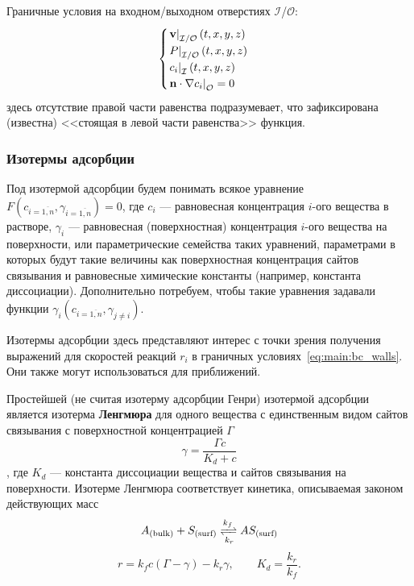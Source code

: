 \documentclass[oneside,final,12pt]{extreport}
\begin{document}
Граничные условия на входном/выходном отверстиях $\mathcal{I}$/$\mathcal{O}$:
\begin{equation}
\begin{cases}
  \left. \vb v \right|_{\mathcal{I}/\mathcal{O}}\left(t, x, y, z\right) \\
  \left. P \right|_{\mathcal{I}/\mathcal{O}}\left(t, x, y, z\right) \\
  \left. c_i \right|_{\mathcal{I}}\left(t, x, y, z\right) \\
  \left. \vb n \cdot \nabla c_i \right|_{\mathcal{O}} = 0 \\
\end{cases}
\label{eq:main:bc_io}
\end{equation}
здесь отсутствие правой части равенства подразумевает, что зафиксирована
(известна) <<стоящая в левой части равенства>> функция.


\subsubsection*{Изотермы адсорбции}
Под изотермой адсорбции будем понимать всякое уравнение
$F\left(c_{i=\overline{1,n}}, \gamma_{i=\overline{1,n}}\right) = 0$, где
$c_i$ --- равновесная концентрация $i$-ого вещества в растворе,
$\gamma_i$ --- равновесная (поверхностная) концентрация $i$-ого вещества
на поверхности, или параметрические семейства таких уравнений,
параметрами в которых будут такие величины как
поверхностная концентрация сайтов связывания и
равновесные химические константы (например, константа диссоциации).
Дополнительно потребуем, чтобы такие уравнения задавали функции
$\gamma_i\left(c_{i=\overline{1,n}}, \gamma_{j\neq i}\right)$.

Изотермы адсорбции здесь представляют интерес с точки зрения получения
выражений для скоростей реакций $r_i$ в
граничных условиях~\eqref{eq:main:bc_walls}.
Они также могут использоваться для приближений.

Простейшей (не считая изотерму адсорбции Генри) изотермой адсорбции является
изотерма \textbf{Ленгмюра} для одного вещества
с единственным видом сайтов связывания
с поверхностной концентрацией $\Gamma$
\begin{equation}
  \gamma = \frac{\Gamma c}{K_d + c}
\label{eq:Langmuir_single_eq}
\end{equation}%
\cite{bib:adsorption_reaction_principles},
где $K_d$ --- константа диссоциации вещества и сайтов связывания на поверхности.
Изотерме Ленгмюра соответствует кинетика, описываемая законом действующих масс
\[ A_{\left(\text{bulk}\right)} + S_{\left(\text{surf}\right)} \xrightleftharpoons[k_r]{k_f} AS_{\left(\text{surf}\right)} \]
\begin{equation}
  r = k_f c \left(\Gamma - \gamma\right) - k_r \gamma,\qquad K_d = \frac{k_r}{k_f}.
\label{eq:Langmuir_single_kin}
\end{equation}
\end{document}
